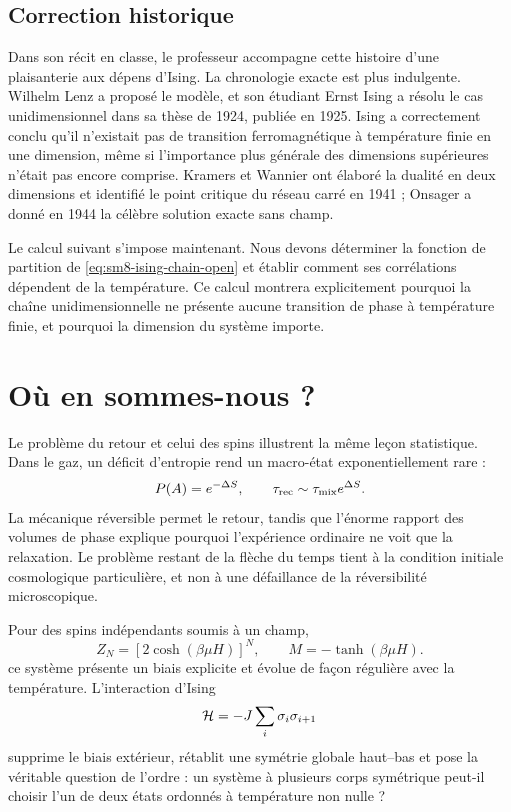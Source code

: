 \subsection{Correction historique}

Dans son récit en classe, le professeur accompagne cette histoire d’une plaisanterie aux dépens d’Ising. La chronologie exacte est plus indulgente. Wilhelm Lenz a proposé le modèle, et son étudiant Ernst Ising a résolu le cas unidimensionnel dans sa thèse de 1924, publiée en 1925. Ising a correctement conclu qu’il n’existait pas de transition ferromagnétique à température finie en une dimension, même si l’importance plus générale des dimensions supérieures n’était pas encore comprise. Kramers et Wannier ont élaboré la dualité en deux dimensions et identifié le point critique du réseau carré en 1941 ; Onsager a donné en 1944 la célèbre solution exacte sans champ.

Le calcul suivant s’impose maintenant. Nous devons déterminer la fonction de partition de \eqref{eq:sm8-ising-chain-open} et établir comment ses corrélations dépendent de la température. Ce calcul montrera explicitement pourquoi la chaîne unidimensionnelle ne présente aucune transition de phase à température finie, et pourquoi la dimension du système importe.

\section{Où en sommes-nous ?}

Le problème du retour et celui des spins illustrent la même leçon statistique. Dans le gaz, un déficit d’entropie rend un macro-état exponentiellement rare :
\begin{equation}
 P(A)=e^{-\Delta S},
 \qquad
 \tau_{\rm rec}\sim\tau_{\rm mix}e^{\Delta S}.
 \label{eq:sm8-summary-recurrence}
\end{equation}
La mécanique réversible permet le retour, tandis que l’énorme rapport des volumes de phase explique pourquoi l’expérience ordinaire ne voit que la relaxation. Le problème restant de la flèche du temps tient à la condition initiale cosmologique particulière, et non à une défaillance de la réversibilité microscopique.

Pour des spins indépendants soumis à un champ,
\begin{equation}
 Z_N=\left[2\cosh(\beta\mu H)\right]^N,
 \qquad
 M=-\tanh(\beta\mu H).
 \label{eq:sm8-summary-spins}
\end{equation}
ce système présente un biais explicite et évolue de façon régulière avec la température. L’interaction d’Ising
\begin{equation}
 {\cal H}=-J\sum_i\sigma_i\sigma_{i+1}
 \label{eq:sm8-summary-ising}
\end{equation}
supprime le biais extérieur, rétablit une symétrie globale haut--bas et pose la véritable question de l’ordre : un système à plusieurs corps symétrique peut-il choisir l’un de deux états ordonnés à température non nulle ?